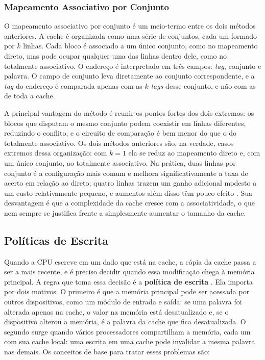 \documentclass[12pt]{article}
\begin{document}
\subsubsection{Mapeamento Associativo por Conjunto}

O mapeamento associativo por conjunto é um meio-termo entre os dois métodos
anteriores. A cache é organizada como uma série de conjuntos, cada um
formado por $k$ linhas. Cada bloco é associado a um único conjunto, como no mapeamento
direto, mas pode ocupar qualquer uma das linhas dentro dele, como no
totalmente associativo. O endereço é interpretado em três campos:
\textit{tag}, conjunto e palavra. O campo de conjunto leva diretamente ao
conjunto correspondente, e a \textit{tag} do endereço é comparada apenas com
as $k$ \textit{tags} desse conjunto, e não com as de toda a cache.

A principal vantagem do método é reunir os pontos fortes dos dois extremos:
os blocos que disputam o mesmo conjunto podem coexistir em linhas diferentes,
reduzindo o conflito, e o circuito de comparação é bem menor do que o do
totalmente associativo. Os dois métodos anteriores são, na verdade, casos
extremos dessa organização: com $k = 1$ ela se reduz ao mapeamento direto
e, com um único conjunto, ao totalmente associativo. Na prática, duas linhas
por conjunto é a configuração mais comum e melhora significativamente a taxa
de acerto em relação ao direto; quatro linhas trazem um ganho adicional
modesto a um custo relativamente pequeno, e aumentos além disso têm pouco
efeito \cite{hill1989}.
Sua desvantagem é que a complexidade da cache cresce com a associatividade,
o que nem sempre se justifica frente a simplesmente aumentar o tamanho da
cache.

\subsection{Políticas de Escrita}

Quando a CPU escreve em um dado que está na cache, a cópia da cache passa
a ser a mais recente, e é preciso decidir quando essa modificação chega à
memória principal. A regra que toma essa decisão é a \textbf{política de
escrita} \cite{stallings2017}. Ela importa por dois motivos. O primeiro é que a
memória principal pode ser acessada por outros dispositivos, como um módulo
de entrada e saída: se uma palavra foi alterada apenas na cache, o valor na
memória está desatualizado e, se o dispositivo alterou a memória, é a
palavra da cache que fica desatualizada. O segundo surge quando vários
processadores compartilham a memória, cada um com sua cache local: uma
escrita em uma cache pode invalidar a mesma palavra nas demais. Os conceitos
de base para tratar esses problemas são:
\end{document}
